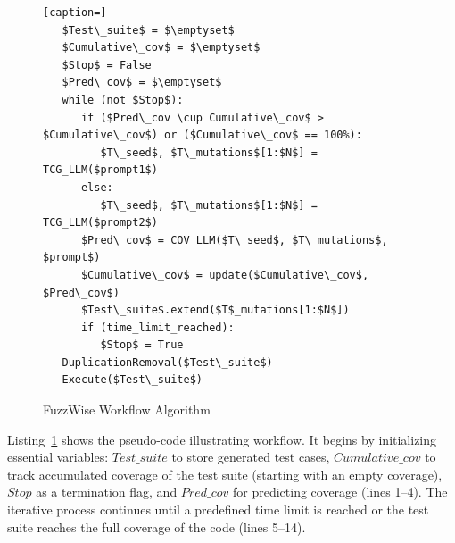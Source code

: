 \begin{figure}
\begin{lstlisting}[caption=]
   $Test\_suite$ = $\emptyset$
   $Cumulative\_cov$ = $\emptyset$
   $Stop$ = False
   $Pred\_cov$ = $\emptyset$
   while (not $Stop$):
      if ($Pred\_cov \cup Cumulative\_cov$ > $Cumulative\_cov$) or ($Cumulative\_cov$ == 100%):
         $T\_seed$, $T\_mutations$[1:$N$] = TCG_LLM($prompt1$)
      else:
         $T\_seed$, $T\_mutations$[1:$N$] = TCG_LLM($prompt2$)
      $Pred\_cov$ = COV_LLM($T\_seed$, $T\_mutations$, $prompt$)
      $Cumulative\_cov$ = update($Cumulative\_cov$, $Pred\_cov$)
      $Test\_suite$.extend($T$_mutations[1:$N$])
      if (time_limit_reached):
         $Stop$ = True
   DuplicationRemoval($Test\_suite$)
   Execute($Test\_suite$)
\end{lstlisting}
\vspace{-6pt}
\caption{FuzzWise Workflow Algorithm}
\label{algo}
\end{figure}

Listing~\ref{algo} shows the pseudo-code illustrating {\tool}
workflow. It begins by initializing essential variables:
$Test\_suite$ to store generated test cases, $Cumulative\_cov$
to track accumulated coverage of the test suite (starting with an
empty coverage), $Stop$ as a termination flag, and $Pred\_cov$ for
predicting coverage (lines 1--4). The iterative process continues
until a predefined time limit is reached or the test suite reaches the
full coverage of the code (lines 5--14).



